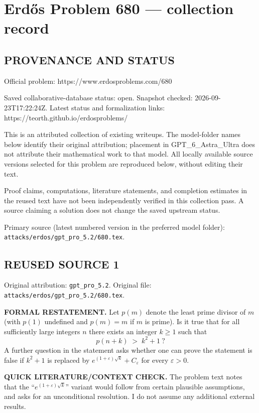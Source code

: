 \section*{Erd\H{o}s Problem 680 --- collection record}

\subsection*{PROVENANCE AND STATUS}
Official problem: https://www.erdosproblems.com/680

Saved collaborative-database status: open.
Snapshot checked: 2026-09-23T17:22:24Z.
Latest status and formalization links: https://teorth.github.io/erdosproblems/

This is an attributed collection of existing writeups. The model-folder names below identify their original attribution; placement in GPT\_6\_Astra\_Ultra does not attribute their mathematical work to that model. All locally available source versions selected for this problem are reproduced below, without editing their text.

Proof claims, computations, literature statements, and completion estimates in the reused text have not been independently verified in this collection pass. A source claiming a solution does not change the saved upstream status.

Primary source (latest numbered version in the preferred model folder): \texttt{attacks/erdos/gpt\_pro\_5.2/680.tex}.

\subsection*{REUSED SOURCE 1}
Original attribution: \texttt{gpt\_pro\_5.2}.
Original file: \texttt{attacks/erdos/gpt\_pro\_5.2/680.tex}.

\item
\textbf{FORMAL RESTATEMENT.}
Let $p(m)$ denote the least prime divisor of $m$ (with $p(1)$ undefined and $p(m)=m$ if $m$ is prime). Is it true that for all sufficiently large integers $n$ there exists an integer $k\ge1$ such that
\[
p(n+k)\;>\;k^{2}+1\ ?
\]
A further question in the statement asks whether one can prove the statement is false if $k^{2}+1$ is replaced by $e^{(1+\varepsilon)\sqrt{k}}+C_{\varepsilon}$ for every $\varepsilon>0$.

\textbf{QUICK LITERATURE/CONTEXT CHECK.}
The problem text notes that the ``$e^{(1+\varepsilon)\sqrt{k}}$'' variant would follow from certain plausible assumptions, and asks for an unconditional resolution. I do not assume any additional external results.

